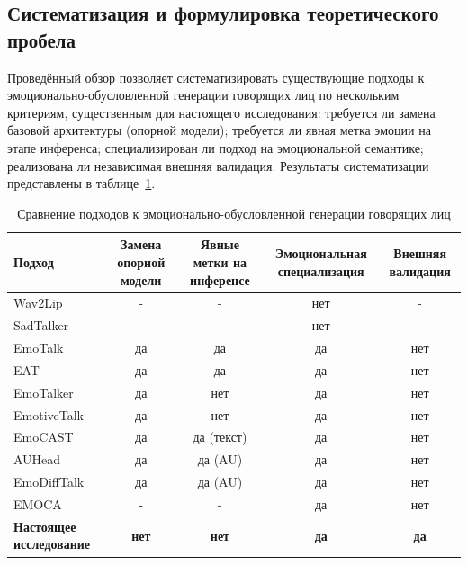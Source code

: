 \documentclass[a4paper, 12pt, oneside, openany]{article}
\begin{document}
\subsection{Систематизация и формулировка теоретического пробела}

Проведённый обзор позволяет систематизировать существующие подходы к эмоционально-обусловленной генерации говорящих лиц по нескольким критериям, существенным для настоящего исследования: требуется ли замена базовой архитектуры (опорной модели); требуется ли явная метка эмоции на этапе инференса; специализирован ли подход на эмоциональной семантике; реализована ли независимая внешняя валидация. Результаты систематизации представлены в таблице~\ref{tab:approaches_comparison}.

\renewcommand{\arraystretch}{1.3}
\renewcommand{\tabcolsep}{0.15cm}
\begin{table}[H]
\caption{Сравнение подходов к эмоционально-обусловленной генерации говорящих лиц}
\label{tab:approaches_comparison}
\centering
\small
\begin{tabular}{|p{4.5cm}|c|c|c|c|}
\hline
\textbf{Подход} & \textbf{Замена опорной модели} & \textbf{Явные метки на инференсе} & \textbf{Эмоциональная специализация} & \textbf{Внешняя валидация} \\
\hline
Wav2Lip \cite{prajwal2020wav2lip} & - & - & нет & - \\
\hline
SadTalker \cite{zhang2023sadtalker} & - & - & нет & - \\
\hline
EmoTalk \cite{peng2023emotalk} & да & да & да & нет \\
\hline
EAT \cite{wang2023eat} & да & да & да & нет \\
\hline
EmoTalker \cite{shen2024emotalker} & да & нет & да & нет \\
\hline
EmotiveTalk \cite{wang2025emotivetalk} & да & нет & да & нет \\
\hline
EmoCAST \cite{jiang2025emocast} & да & да (текст) & да & нет \\
\hline
AUHead \cite{lyu2026auhead} & да & да (AU) & да & нет \\
\hline
EmoDiffTalk \cite{liu2026emodifftalk} & да & да (AU) & да & нет \\
\hline
EMOCA \cite{danecek2022emoca} & - & - & да & нет \\
\hline
\textbf{Настоящее исследование} & \textbf{нет} & \textbf{нет} & \textbf{да} & \textbf{да} \\
\hline
\end{tabular}
\end{table}
\end{document}
